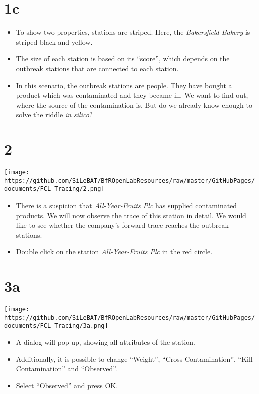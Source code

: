 \documentclass[10pt]{beamer}
\begin{document}
\section{1c}
\begin{frame}
	\begin{itemize}
		\item To show two properties, stations are striped. Here, the \textit{Bakersfield Bakery} is striped  black and yellow.
		\item The size of each station is based on its ``score'', which depends on the outbreak stations that are connected to each station.
		\item In this scenario, the outbreak stations are people. They have bought a product which was contaminated and they became ill. We want to find out, where the source of the contamination is. But do we already know enough to solve the riddle \textit{in silico}?
	\end{itemize}
\end{frame}

\section{2}
\begin{frame}
	\begin{center}
  		\texttt{[image: https://github.com/SiLeBAT/BfROpenLabResources/raw/master/GitHubPages/documents/FCL\_Tracing/2.png]}
	\end{center}
	\begin{itemize}
		\item There is a suspicion that \textit{All-Year-Fruits Plc} has supplied contaminated products. We will now observe the trace of this station in detail. We would like to see whether the company’s forward trace reaches the outbreak stations.
		\item Double click on the station \textit{All-Year-Fruits Plc} in the red circle.
	\end{itemize}
\end{frame}

\section{3a}
\begin{frame}
	\begin{center}
  		\texttt{[image: https://github.com/SiLeBAT/BfROpenLabResources/raw/master/GitHubPages/documents/FCL\_Tracing/3a.png]}
	\end{center}
	\begin{itemize}
		\item A dialog will pop up, showing all attributes of the station.
		\item Additionally, it is possible to change ``Weight'', ``Cross Contamination'', ``Kill Contamination'' and ``Observed''.
		\item Select ``Observed'' and press OK.
	\end{itemize}
\end{frame}
\end{document}
